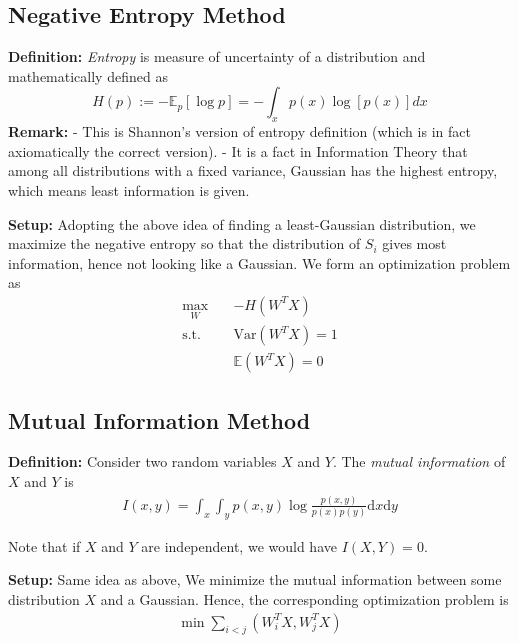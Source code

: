 \subsection{Negative Entropy Method}
\textbf{Definition:} \textit{Entropy} is measure of uncertainty of a distribution and mathematically defined as $$H(p):=-\mathbb{E}_p[\log p]=-\int_x p(x)\log [p(x)]dx$$ \textbf{Remark: } \newline - This is Shannon's version of entropy definition (which is in fact axiomatically the correct version). 
\newline - It is a fact in Information Theory that among all distributions with a fixed variance, Gaussian has the highest entropy, which means least information is given.

\textbf{Setup: }\newline
Adopting the above idea of finding a least-Gaussian distribution, we maximize the negative entropy so that the distribution of $S_i$ gives most information, hence not looking like a Gaussian. We form an optimization problem as
\begin{align*}
    \max_W \quad & -H(W^TX) \\
    \text{s.t.} \quad & \text{Var}(W^TX)=1 \\
                \quad & \mathbb{E}(W^TX) = 0
\end{align*}


\subsection{Mutual Information Method}
\textbf{Definition: } Consider two random variables $X$ and $Y$. The \textit{mutual information} of $X$ and $Y$ is \begin{align*}
    I(x,y) = \int _x \int _y p(x,y) \log \frac{p(x,y)}{p(x)p(y)} \text{d}x \text{d}y
\end{align*}

Note that if $X$ and $Y$ are independent, we would have $I(X,Y) = 0$.

\textbf{Setup:}
Same idea as above, We minimize the mutual information between some distribution $X$ and a Gaussian. Hence, the corresponding optimization problem is
\begin{align*}
    \min \sum _{i<j} (W_i^TX,W^T_jX)
\end{align*}
